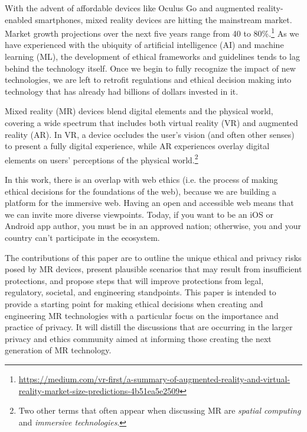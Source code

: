 With the advent of affordable devices like Oculus Go and augmented reality-enabled smartphones, mixed reality devices are hitting the mainstream market. Market growth projections over the next five years range from 40 to 80\%.\footnote{\url{https://medium.com/vr-first/a-summary-of-augmented-reality-and-virtual-reality-market-size-predictions-4b51ea5e2509}} As we have experienced with the ubiquity of artificial intelligence (AI) and machine learning (ML), the development of ethical frameworks and guidelines tends to lag behind the technology itself. Once we begin to fully recognize the impact of new technologies, we are left to retrofit regulations and ethical decision making into technology that has already had billions of dollars invested in it.

Mixed reality (MR) devices blend digital elements and the physical world, covering a wide spectrum that includes both virtual reality (VR) and augmented reality (AR). In VR, a device occludes the user's vision (and often other senses) to present a fully digital experience, while AR experiences overlay digital elements on users' perceptions of the physical world.\footnote{Two other terms that often appear when discussing MR are \emph{spatial computing} and \emph{immersive technologies}.} 

In this work, there is an overlap with web ethics (i.e. the process of making ethical decisions for the foundations of the web), because we are building a platform for the immersive web. Having an open and accessible web means that we can invite more diverse viewpoints. Today, if you want to be an iOS or Android app author, you must be in an approved nation; otherwise, you and your country can't participate in the ecosystem.

The contributions of this paper are to outline the unique ethical and privacy risks posed by MR devices, present plausible scenarios that may result from insufficient protections, and propose steps that will improve protections from legal, regulatory, societal, and engineering standpoints. This paper is intended to provide a starting point for making ethical decisions when creating and engineering MR technologies with a particular focus on the importance and practice of privacy. It will distill the discussions that are occurring in the larger privacy and ethics community aimed at informing those creating the next generation of MR technology.

